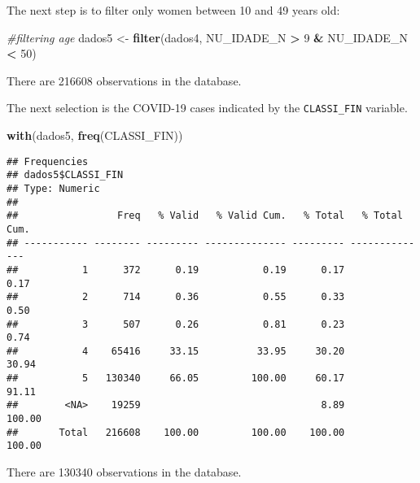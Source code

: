 \documentclass[
]{article}
\newenvironment{Shaded}{\begin{snugshade}}{\end{snugshade}}
\newcommand{\CommentTok}[1]{\textcolor[rgb]{0.56,0.35,0.01}{\textit{#1}}}
\newcommand{\DecValTok}[1]{\textcolor[rgb]{0.00,0.00,0.81}{#1}}
\newcommand{\KeywordTok}[1]{\textcolor[rgb]{0.13,0.29,0.53}{\textbf{#1}}}
\newcommand{\NormalTok}[1]{#1}
\newcommand{\OperatorTok}[1]{\textcolor[rgb]{0.81,0.36,0.00}{\textbf{#1}}}
\newcommand{\StringTok}[1]{\textcolor[rgb]{0.31,0.60,0.02}{#1}}
\begin{document}
The next step is to filter only women between 10 and 49 years old:

\begin{Shaded}
\begin{Highlighting}[]
\CommentTok{#filtering age}
\NormalTok{dados5 <-}\StringTok{ }\KeywordTok{filter}\NormalTok{(dados4, NU_IDADE_N }\OperatorTok{>}\StringTok{ }\DecValTok{9} \OperatorTok{&}\StringTok{ }\NormalTok{NU_IDADE_N }\OperatorTok{<}\StringTok{ }\DecValTok{50}\NormalTok{)}
\end{Highlighting}
\end{Shaded}

There are 216608 observations in the database.

The next selection is the COVID-19 cases indicated by the
\texttt{CLASSI\_FIN} variable.

\begin{Shaded}
\begin{Highlighting}[]
\KeywordTok{with}\NormalTok{(dados5, }\KeywordTok{freq}\NormalTok{(CLASSI_FIN))}
\end{Highlighting}
\end{Shaded}

\begin{verbatim}
## Frequencies  
## dados5$CLASSI_FIN  
## Type: Numeric  
## 
##                 Freq   % Valid   % Valid Cum.   % Total   % Total Cum.
## ----------- -------- --------- -------------- --------- --------------
##           1      372      0.19           0.19      0.17           0.17
##           2      714      0.36           0.55      0.33           0.50
##           3      507      0.26           0.81      0.23           0.74
##           4    65416     33.15          33.95     30.20          30.94
##           5   130340     66.05         100.00     60.17          91.11
##        <NA>    19259                               8.89         100.00
##       Total   216608    100.00         100.00    100.00         100.00
\end{verbatim}

\begin{Shaded}
\end{Shaded}

There are 130340 observations in the database.
\end{document}

